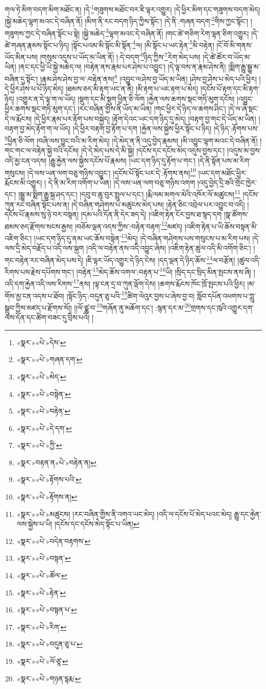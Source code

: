 གལ་ཏེ་མིག་བདག་མིག་མཐོང་ན། །དེ་\footnote{«སྣར་»«པེ་»དེས་}གཟུགས་མཐོང་བར་ཇི་ལྟར་འགྱུར། །དེ་ཕྱིར་མིག་དང་གཟུགས་བདག་མེད། །སྐྱེ་མཆེད་ལྷག་མའང་དེ་བཞིན་ནོ། །མིག་ནི་རང་བདག་ཉིད་ཀྱིས་སྟོང་། །དེ་ནི་:གཞན་བདག་\footnote{«སྣར་»«པེ་»གཞན་དག་}གིས་ཀྱང་སྟོང་། །གཟུགས་ཀྱང་དེ་བཞིན་སྟོང་པ་སྟེ། །སྐྱེ་མཆེད་\footnote{«སྣར་»«པེ་»མེད་}ལྷག་མའང་དེ་བཞིན་ནོ། །གང་ཚེ་གཅིག་རེག་ལྷན་ཅིག་འགྱུར། །དེ་ཚེ་གཞན་རྣམས་སྟོང་པ་ཉིད། །སྟོང་པའམ་མི་སྟོང་མི་སྟོན་\footnote{«སྣར་»«པེ་»བསྟེན་}ལ། །མི་སྟོང་པ་ཡང་རྟེན་\footnote{«སྣར་»«པེ་»བརྟེན་}མི་བརྟེན། །ངོ་བོ་མི་གནས་ཡོད་མིན་པས། །གསུམ་འདུས་པ་ཡོད་མ་ཡིན་ནོ། །:དེ་བདག་\footnote{«སྣར་»«པེ་»དེ་དག་}ཉིད་ཀྱིས་\footnote{«སྣར་»«པེ་»ཀྱི་}རེག་མེད་པས། །དེ་ཚེ་ཚོར་བ་ཡོད་མ་ཡིན། །ནང་དང་ཕྱི་ཡི་སྐྱེ་མཆེད་ལ། །བརྟེན་ནས་རྣམ་པར་ཤེས་པ་འབྱུང་། །དེ་ལྟ་བས་ན་རྣམ་ཤེས་ནི། །སྨིག་རྒྱུ་སྒྱུ་མ་བཞིན་དུ་སྟོང་། །རྣམ་ཤེས་ཤེས་བྱ་ལ་:བརྟེན་ནས།\footnote{«སྣར་»བརྟན་ན«པེ་»བརྟེན་ན།} །འབྱུང་ལ་ཤེས་བྱ་ཡོད་མ་ཡིན། །ཤེས་བྱ་ཤེས་པ་མེད་པའི་ཕྱིར། །དེ་ཕྱིར་ཤེས་པ་པོ་ཉིད་མེད། །ཐམས་ཅད་མི་རྟག་ཡང་ན་ནི། །མི་རྟག་པ་ཡང་རྟག་པ་མེད། །དངོས་པོ་རྟག་དང་མི་རྟག་ཉིད། །འགྱུར་ན་དེ་ལྟ་ག་ལ་ཡོད། །སྡུག་དང་མི་སྡུག་ཕྱིན་ཅི་ལོག །རྐྱེན་ལས་ཆགས་སྡང་གཏི་མུག་དངོས། །འབྱུང་ཕྱིར་ཆགས་སྡང་གཏི་མུག་དང་། །རང་བཞིན་གྱིས་ནི་ཡོད་མ་ཡིན། །གང་ཕྱིར་དེ་ཉིད་ལ་ཆགས་ཤིང་། །དེ་ལ་ཞེ་སྡང་དེ་ལ་རྨོངས། །དེ་ཕྱིར་རྣམ་པར་རྟོག་པས་བསྐྱེད། །རྟོག་དེའང་ཡང་དག་ཉིད་དུ་མེད། །བརྟག་བྱ་གང་དེ་ཡོད་མ་ཡིན། །བརྟག་བྱ་མེད་རྟོག་ག་ལ་ཡོད། །དེ་ཕྱིར་བརྟག་བྱ་རྟོག་པ་དག །རྐྱེན་ལས་སྐྱེས་ཕྱིར་སྟོང་པ་ཉིད། །དེ་ཉིད་:རྟོགས་པས་\footnote{«སྣར་»«པེ་»རྟོགས་པའི་}ཕྱིན་ཅི་ལོག །བཞི་ལས་བྱུང་བའི་མ་རིག་མེད། །དེ་མེད་ན་ནི་འདུ་བྱེད་རྣམས། །མི་འབྱུང་ལྷག་མའང་དེ་བཞིན་ནོ། །གང་གང་ལ་བརྟེན་སྐྱེ་བའི་དངོས། །དེ་དེ་མེད་པས་དེ་མི་སྐྱེ། །དངོས་དང་དངོས་མེད་འདུས་བྱས་དང་། །འདུས་མ་བྱས་འདི་མྱ་ངན་འདས། །རྒྱུ་རྐྱེན་ལས་སྐྱེས་དངོས་པོ་རྣམས། །ཡང་དག་ཉིད་དུ་རྟོག་པ་གང་། །དེ་ནི་སྟོན་པས་མ་རིག་གསུངས། །དེ་ལས་ཡན་ལག་བཅུ་གཉིས་འབྱུང་། །དངོས་པོ་སྟོང་པར་དེ་:རྟོགས་ནས།\footnote{«སྣར་»«པེ་»རྟོགས་ན།} །ཡང་དག་མཐོང་ཕྱིར་རྨོངས་མི་འགྱུར། །
དེ་ནི་མ་རིག་འགོག་པ་ཡིན། །དེ་ལས་ཡན་ལག་བཅུ་གཉིས་འགག །འདུ་བྱེད་དྲི་ཟའི་གྲོང་ཁྱེར་དང་། །སྒྱུ་མ་སྨིག་རྒྱུ་སྐྲ་ཤད་དང་། །དབུ་བ་ཆུ་བུར་སྤྲུལ་པ་དང་། །རྨི་ལམ་མགལ་མེའི་འཁོར་ལོ་མཚུངས།\footnote{«སྣར་»«པེ་»མཚུངས། །རང་བཞིན་གྱིས་ནི་འགའ་ཡང་མེད། །འདི་ལ་དངོས་པོ་མེད་པའང་མེད། རྒྱུ་དང་རྐྱེན་ལས་སྐྱེས་པ་ཡི། །དངོས་དང་དངོས་མེད་སྟོང་པ་ཡིན།} །དངོས་ཀུན་རང་བཞིན་སྟོང་པས་ན། །དེ་བཞིན་གཤེགས་པ་མཚུངས་མེད་པས། །རྟེན་ཅིང་འབྲེལ་པར་འབྱུང་བ་འདི། །དངོས་པོ་རྣམས་སུ་ཉེ་བར་བསྟན། །དམ་པའི་དོན་ནི་དེར་ཟད་དེ། །འཇིག་རྟེན་ངོར་བྱས་ཐ་སྙད་དག །སྣ་ཚོགས་ཐམས་ཅད་རྫོགས་སངས་རྒྱས། །བཅོམ་ལྡན་འདས་ཀྱིས་:བརྟེན་བརྟག་\footnote{«སྣར་»«པེ་»བདེན་བརྟགས་}མཛད། །འཇིག་རྟེན་པ་ཡི་ཆོས་བསྟན་མི་འཇིག་ཅིང་། །ཡང་དག་ཉིད་དུ་ནམ་ཡང་ཆོས་བསྟེན་\footnote{«སྣར་»«པེ་»བསྟན་}མེད། །དེ་བཞིན་གཤེགས་པས་གསུངས་པ་མ་རིག་པས། །དེ་ལས་དྲི་མེད་བརྗོད་པ་འདི་ལས་སྐྲག །འདི་ལ་བརྟེན་ནས་འདི་འབྱུང་ཞེས། །འཇིག་རྟེན་ཚུལ་འདི་མི་འགོག་ཅིང་། །གང་བརྟེན་རང་བཞིན་མེད་པས་དེ། །ཇི་ལྟར་ཡོད་འགྱུར་དེ་ཉིད་ངེས། །དད་ལྡན་དེ་ཉིད་ཆོས་\footnote{«སྣར་»«པེ་»ཚོལ་}ལ་བརྩོན། །ཚུལ་འདི་རིགས་པས་རྗེས་དཔོགས་གང་། །བརྟེན་\footnote{«སྣར་»«པེ་»རྟེན་}མེད་ཆོས་འགལ་:བརྟན་པ་\footnote{«སྣར་»«པེ་»བསྟན་པ་}ཡི། །སྲིད་དང་སྲིད་མིན་སྤངས་ནས་ཞི། །འདི་དག་རྐྱེན་འདི་ལས་རིགས་\footnote{«སྣར་»«པེ་»རིག་}ནས། །ལྟ་ངན་དྲ་བ་ཀུན་ལྡོག་དེས། །ཆགས་རྨོངས་ཁོང་ཁྲོ་སྤངས་པའི་ཕྱིར། །མ་གོས་མྱ་ངན་འདས་པ་ཐོབ། །སྟོང་ཉིད་:བདུན་ཅུ་པའི་\footnote{«སྣར་»«པེ་»བདུན་ཅུ་པ་}ཚིག་ལེའུར་བྱས་པ་ཞེས་བྱ་བ། སློབ་དཔོན་འཕགས་པ་ཀླུ་སྒྲུབ་ཀྱིས་མཛད་པ་རྫོགས་སོ།། །།ལོ་ཙྪ་བ་\footnote{«སྣར་»«པེ་»ལོ་ཙཱ་}གཞོན་ནུ་མཆོག་དང་། :སྙན་དར་མ་\footnote{«སྣར་»«པེ་»གཉན་དྷརྨ་}གྲགས་དང་ཁུའི་འགྱུར་དག་ལས་དོན་དང་ཚིག་བཟང་དུ་བྲིས་པའོ། ། 